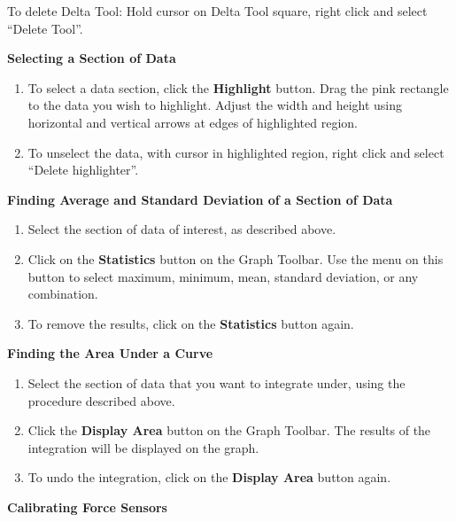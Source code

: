 \begin{center}
To delete Delta Tool: Hold cursor on Delta Tool square, right click and select ``Delete Tool''.
\end{center}

\vspace{5mm}
\textbf{Selecting a Section of Data}

\begin{enumerate}
\item To select a data section, click the \textbf{Highlight} button.  Drag the pink rectangle to the data you wish to highlight.  Adjust the width and height using horizontal and vertical arrows at edges of highlighted region.
\item To unselect the data, with cursor in highlighted region, right click and select ``Delete highlighter''.
\end{enumerate}
\vspace{5mm}
\textbf{Finding Average and Standard Deviation of a Section of Data}

\begin{enumerate}
\item Select the section of data of interest, as described above.
\item Click on the \textbf{Statistics} button on the Graph Toolbar. Use the menu on this button to select maximum, minimum, mean, standard deviation, or any combination.
\item To remove the results, click on the \textbf{Statistics} button again.
\end{enumerate}


\pagebreak[2]
\vspace{5mm}
\textbf{Finding the Area Under a Curve}

\begin{enumerate}
\item Select the section of data that you want to integrate under, using the procedure described above.
\item Click the \textbf{Display Area} button on the Graph Toolbar.
The results of the integration will be displayed on the graph.
\item To undo the integration, click on the \textbf{Display Area} button again.
\end{enumerate}

\pagebreak[2]

\textbf{Calibrating Force Sensors}

